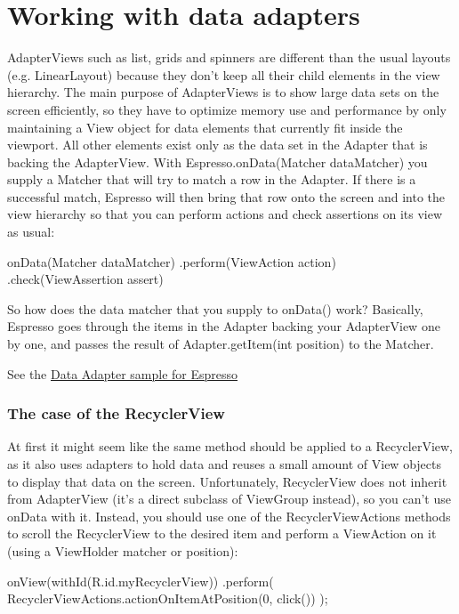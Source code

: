 \section{Working with data adapters}
AdapterViews such as list, grids and spinners are different than the usual layouts (e.g. LinearLayout) because they don’t keep all their child elements in the view hierarchy. The main purpose of AdapterViews is to show large data sets on the screen efficiently, so they have to optimize memory use and performance by only maintaining a View object for data elements that currently fit inside the viewport.
All other elements exist only as the data set in the Adapter that is backing the AdapterView. With Espresso.onData(Matcher dataMatcher) you supply a Matcher that will try to match a row in the Adapter. If there is a successful match, Espresso will then bring that row onto the screen and into the view hierarchy so that you can perform actions and check assertions on its view as usual:

\begin{android}
onData(Matcher dataMatcher)
.perform(ViewAction action)
.check(ViewAssertion assert)
\end{android}


So how does the data matcher that you supply to onData() work? Basically, Espresso goes through the items in the Adapter backing your AdapterView one by one, and passes the result of Adapter.getItem(int position) to the Matcher.

See the \href{https://github.com/googlesamples/android-testing/tree/master/ui/espresso/DataAdapterSample}{Data Adapter sample for Espresso}

\subsubsection{The case of the RecyclerView}


At first it might seem like the same method should be applied to a RecyclerView, as it also uses adapters to hold data and reuses a small amount of View objects to display that data on the screen. Unfortunately, RecyclerView does not inherit from AdapterView (it’s a direct subclass of ViewGroup instead), so you can’t use onData with it.
Instead, you should use one of the RecyclerViewActions methods to scroll the RecyclerView to the desired item and perform a ViewAction on it (using a ViewHolder matcher or position):

\begin{android}
onView(withId(R.id.myRecyclerView))
.perform(
RecyclerViewActions.actionOnItemAtPosition(0, click())
);
\end{android}

